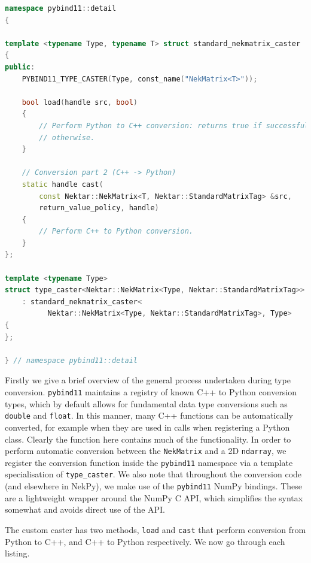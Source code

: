 \begin{lstlisting}[caption={Converter method for converting the C++ arrays into Python NumPy arrays.}, label={lst:c_to_python}, language=C++]
namespace pybind11::detail
{

template <typename Type, typename T> struct standard_nekmatrix_caster
{
public:
    PYBIND11_TYPE_CASTER(Type, const_name("NekMatrix<T>"));

    bool load(handle src, bool)
    {
        // Perform Python to C++ conversion: returns true if successful, false
        // otherwise.
    }

    // Conversion part 2 (C++ -> Python)
    static handle cast(
        const Nektar::NekMatrix<T, Nektar::StandardMatrixTag> &src,
        return_value_policy, handle)
    {
        // Perform C++ to Python conversion.         
    }
};

template <typename Type>
struct type_caster<Nektar::NekMatrix<Type, Nektar::StandardMatrixTag>>
    : standard_nekmatrix_caster<
          Nektar::NekMatrix<Type, Nektar::StandardMatrixTag>, Type>
{
};

} // namespace pybind11::detail
\end{lstlisting}

Firstly we give a brief overview of the general process undertaken during type
conversion. \texttt{pybind11} maintains a registry of known C++ to Python
conversion types, which by default allows for fundamental data type conversions
such as \texttt{double} and \texttt{float}. In this manner, many C++ functions
can be automatically converted, for example when they are used in 
calls when registering a Python class. Clearly the  function here
contains much of the functionality. In order to perform automatic conversion
between the \texttt{NekMatrix} and a 2D \texttt{ndarray}, we register the
conversion function inside the \texttt{pybind11} namespace via a template
specialisation of \texttt{type\_caster}. We also note that throughout the
conversion code (and elsewhere in NekPy), we make use of the \texttt{pybind11}
NumPy bindings. These are a lightweight wrapper around the NumPy C API, which
simplifies the syntax somewhat and avoids direct use of the API.

The custom caster has two methods, \texttt{load} and \texttt{cast} that perform
conversion from Python to C++, and C++ to Python respectively. We now go through
each listing.

